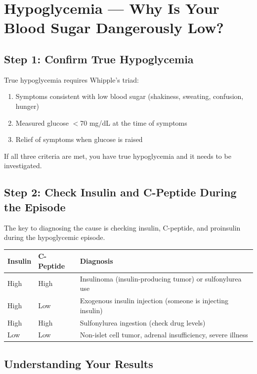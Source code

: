 \clearpage
\section{Hypoglycemia --- Why Is Your Blood Sugar Dangerously Low?}

\subsection{Step 1: Confirm True Hypoglycemia}

True hypoglycemia requires Whipple's triad:
\begin{enumerate}
    \item Symptoms consistent with low blood sugar (shakiness, sweating, confusion, hunger)
    \item Measured glucose $<$70 mg/dL at the time of symptoms
    \item Relief of symptoms when glucose is raised
\end{enumerate}

If all three criteria are met, you have true hypoglycemia and it needs to be investigated.

\subsection{Step 2: Check Insulin and C-Peptide During the Episode}

The key to diagnosing the cause is checking insulin, C-peptide, and proinsulin during the hypoglycemic episode.

\begin{longtable}{@{}p{2.0cm}p{2.5cm}p{9.0cm}@{}}
\toprule
\textbf{Insulin} & \textbf{C-Peptide} & \textbf{Diagnosis} \\
\midrule
High & High & Insulinoma (insulin-producing tumor) or sulfonylurea use \\
High & Low & Exogenous insulin injection (someone is injecting insulin) \\
High & High & Sulfonylurea ingestion (check drug levels) \\
Low & Low & Non-islet cell tumor, adrenal insufficiency, severe illness \\
\bottomrule
\end{longtable}

\subsection{Understanding Your Results}

